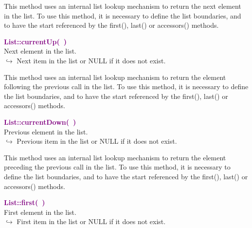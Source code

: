 This method uses an internal list lookup mechanism to return the next element in the list.
To use this method, it is necessary to define the list boundaries, and to have the start referenced by the first(), last() or accessors() methods.

\textcolor{purple}{\textbf{List::currentUp(~)}}\label{List::currentUp()}\\
Next element in the list.\\ \hspace*{10mm}$\hookrightarrow$ Next item in the list or NULL if it does not exist.

This method uses an internal list lookup mechanism to return the element following the previous call in the list.
To use this method, it is necessary to define the list boundaries, and to have the start referenced by the first(), last() or accessors() methods.

\textcolor{purple}{\textbf{List::currentDown(~)}}\label{List::currentDown()}\\
Previous element in the list.\\ \hspace*{10mm}$\hookrightarrow$ Previous item in the list or NULL if it does not exist.

This method uses an internal list lookup mechanism to return the element preceding the previous call in the list.
To use this method, it is necessary to define the list boundaries, and to have the start referenced by the first(), last() or accessors() methods.

\textcolor{purple}{\textbf{List::first(~)}}\label{List::first()}\\
First element in the list.\\ \hspace*{10mm}$\hookrightarrow$ First item in the list or NULL if it does not exist.

